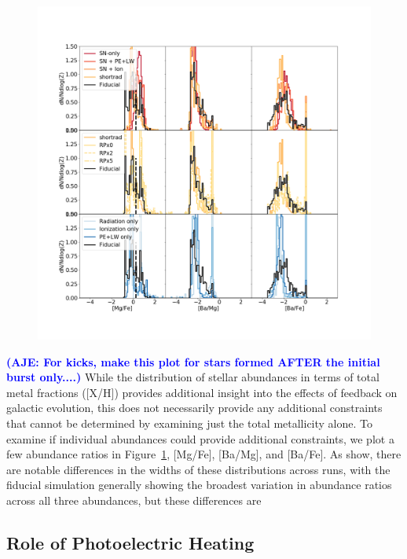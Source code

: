 \documentclass[twocolumn]{aastex62}
\newcommand{\aje}[1]{\textcolor{blue}{\textbf{(AJE: #1)}}}
\begin{document}
\begin{figure}
  \centering
  \includegraphics[width=0.95\linewidth]{figures/MgFe_BaMg_BaFe__stellar_MDFs}
  \caption{}
  \label{fig:MDF2}
\end{figure}

\aje{For kicks, make this plot for stars formed AFTER the initial burst only....}
While the distribution of stellar abundances in terms of total metal fractions ([X/H]) provides additional insight into the effects of feedback on galactic evolution, this does not necessarily provide any additional constraints that cannot be determined by examining just the total metallicity alone. To examine if individual abundances could provide additional constraints, we plot a few abundance ratios in Figure~\ref{fig:MDF2}, [Mg/Fe], [Ba/Mg], and [Ba/Fe]. As show, there are notable differences in the widths of these distributions across runs, with the fiducial simulation generally showing the broadest variation in abundance ratios across all three abundances, but these differences are 


\subsection{Role of Photoelectric Heating}
\end{document}
